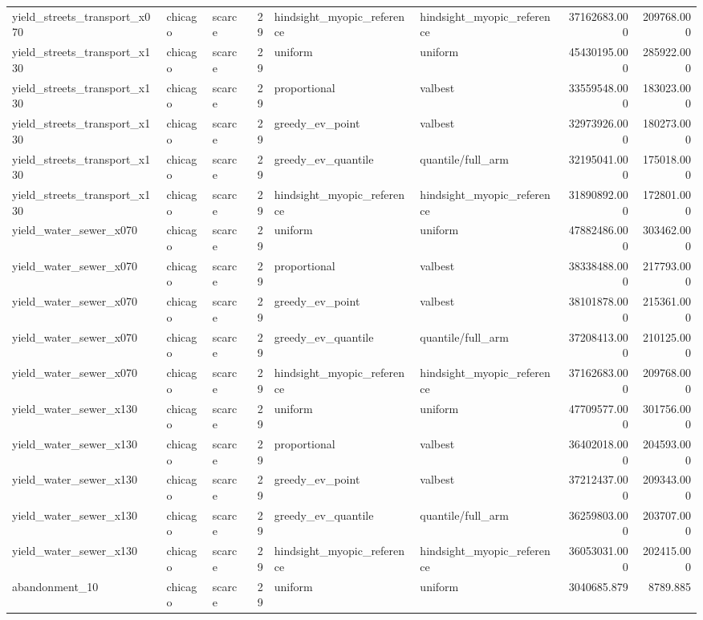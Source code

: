 \begin{tabular}{lllrllrr}
yield\_streets\_transport\_x070 & chicago & scarce & 29 & hindsight\_myopic\_reference & hindsight\_myopic\_reference & 37162683.000 & 209768.000 \\
yield\_streets\_transport\_x130 & chicago & scarce & 29 & uniform & uniform & 45430195.000 & 285922.000 \\
yield\_streets\_transport\_x130 & chicago & scarce & 29 & proportional & valbest & 33559548.000 & 183023.000 \\
yield\_streets\_transport\_x130 & chicago & scarce & 29 & greedy\_ev\_point & valbest & 32973926.000 & 180273.000 \\
yield\_streets\_transport\_x130 & chicago & scarce & 29 & greedy\_ev\_quantile & quantile/full\_arm & 32195041.000 & 175018.000 \\
yield\_streets\_transport\_x130 & chicago & scarce & 29 & hindsight\_myopic\_reference & hindsight\_myopic\_reference & 31890892.000 & 172801.000 \\
yield\_water\_sewer\_x070 & chicago & scarce & 29 & uniform & uniform & 47882486.000 & 303462.000 \\
yield\_water\_sewer\_x070 & chicago & scarce & 29 & proportional & valbest & 38338488.000 & 217793.000 \\
yield\_water\_sewer\_x070 & chicago & scarce & 29 & greedy\_ev\_point & valbest & 38101878.000 & 215361.000 \\
yield\_water\_sewer\_x070 & chicago & scarce & 29 & greedy\_ev\_quantile & quantile/full\_arm & 37208413.000 & 210125.000 \\
yield\_water\_sewer\_x070 & chicago & scarce & 29 & hindsight\_myopic\_reference & hindsight\_myopic\_reference & 37162683.000 & 209768.000 \\
yield\_water\_sewer\_x130 & chicago & scarce & 29 & uniform & uniform & 47709577.000 & 301756.000 \\
yield\_water\_sewer\_x130 & chicago & scarce & 29 & proportional & valbest & 36402018.000 & 204593.000 \\
yield\_water\_sewer\_x130 & chicago & scarce & 29 & greedy\_ev\_point & valbest & 37212437.000 & 209343.000 \\
yield\_water\_sewer\_x130 & chicago & scarce & 29 & greedy\_ev\_quantile & quantile/full\_arm & 36259803.000 & 203707.000 \\
yield\_water\_sewer\_x130 & chicago & scarce & 29 & hindsight\_myopic\_reference & hindsight\_myopic\_reference & 36053031.000 & 202415.000 \\
abandonment\_10 & chicago & scarce & 29 & uniform & uniform & 3040685.879 & 8789.885 \\

\end{tabular}
